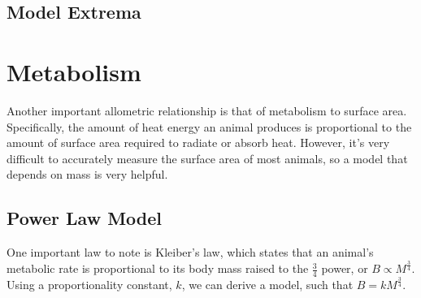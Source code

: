 \documentclass[10pt,letterpaper]{article}
\begin{document}
		\subsection{Model Extrema}
	\section{Metabolism}
		Another important allometric relationship is that of metabolism to surface area. Specifically, the amount of heat energy an animal produces is proportional to the amount of surface area required to radiate or absorb heat. However, it's very difficult to accurately measure the surface area of most animals, so a model that depends on mass is very helpful. 
		\subsection{Power Law Model}
			One important law to note is Kleiber's law, which states that an animal's metabolic rate is proportional to its body mass raised to the $\frac 3 4$ power, or $B \propto M^{\frac 3 4}$. Using a proportionality constant, $k$, we can derive a model, such that $B = kM^{\frac 3 4}$.
\end{document}
